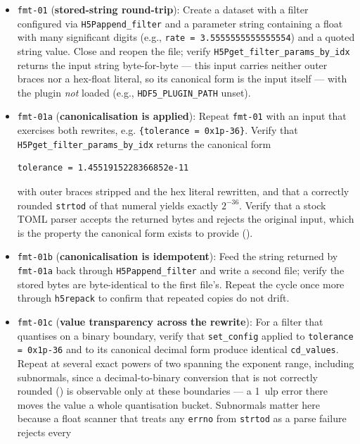 \documentclass[../RFC-HDFG-2026-001.tex]{subfiles}
\begin{document}
\begin{itemize}
\item \texttt{fmt-01} (\textbf{stored-string round-trip}): Create a dataset
  with a filter configured via \texttt{H5Pappend\_filter} and a parameter
  string containing a float with many significant digits (e.g.,
  \texttt{rate = 3.5555555555555554}) and a quoted string value.  Close and
  reopen the file; verify \texttt{H5Pget\_filter\_params\_by\_idx} returns
  the input string byte-for-byte --- this input carries neither outer braces
  nor a hex-float literal, so its canonical form is the input itself ---
  with the plugin \emph{not} loaded (e.g., \texttt{HDF5\_PLUGIN\_PATH}
  unset).
\item \texttt{fmt-01a} (\textbf{canonicalisation is applied}): Repeat
  \texttt{fmt-01} with an input that exercises both rewrites, e.g.
  \texttt{\{tolerance = 0x1p-36\}}.  Verify that
  \texttt{H5Pget\_filter\_params\_by\_idx} returns the canonical form
\begin{Verbatim}[fontsize=\scriptsize]
    tolerance = 1.4551915228366852e-11
\end{Verbatim}
  \noindent with outer braces stripped and the hex literal rewritten, and
  that a correctly rounded \texttt{strtod} of that numeral yields exactly
  $2^{-36}$.  Verify that a stock TOML parser
  accepts the returned bytes and rejects the original input, which is the
  property the canonical form exists to provide
  ().
\item \texttt{fmt-01b} (\textbf{canonicalisation is idempotent}): Feed the
  string returned by \texttt{fmt-01a} back through
  \texttt{H5Pappend\_filter} and write a second file; verify the stored
  bytes are byte-identical to the first file's.  Repeat the cycle once more
  through \texttt{h5repack} to confirm that repeated copies do not drift.
\item \texttt{fmt-01c} (\textbf{value transparency across the rewrite}):
  For a filter that quantises on a binary boundary, verify that
  \texttt{set\_config} applied to \texttt{tolerance = 0x1p-36} and to its
  canonical decimal form produce identical \texttt{cd\_values}.  Repeat at
  several exact powers of two spanning the exponent range, including
  subnormals, since a decimal-to-binary conversion that is not correctly
  rounded () is observable only at these
  boundaries --- a 1~ulp error there moves the value a whole quantisation
  bucket.  Subnormals matter here because a float scanner that treats any
  \texttt{errno} from \texttt{strtod} as a parse failure rejects every

\end{itemize}
\end{document}
